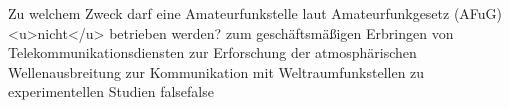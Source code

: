     {Zu welchem Zweck darf eine Amateurfunkstelle laut Amateurfunkgesetz (AFuG) <u>nicht</u> betrieben werden?}
    {zum geschäftsmäßigen Erbringen von Telekommunikationsdiensten}
    {zur Erforschung der atmosphärischen Wellenausbreitung}
    {zur Kommunikation mit Weltraumfunkstellen}
    {zu experimentellen Studien}
    {false}{false}